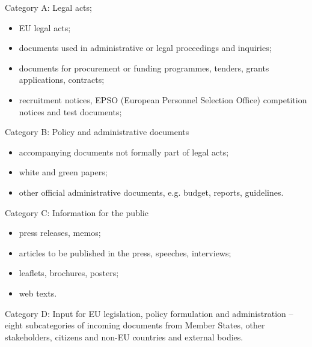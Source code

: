 \documentclass[output=paper]{langsci/langscibook}
\begin{document}
Category A: Legal acts;
\begin{itemize}
\item 
EU legal acts; 
\item 
documents used in administrative or legal proceedings and inquiries; 
\item 
documents for procurement or funding programmes, tenders, grants applications, contracts; 
\item 
recruitment notices, EPSO (European Personnel Selection Office) competition notices and test documents;
\end{itemize}

Category B: Policy and administrative documents

\begin{itemize}
\item 
accompanying documents not formally part of legal acts; 
\item 
white and green papers; 
\item 
other official administrative documents, e.g. budget, reports, guidelines.
\end{itemize}

Category C: Information for the public

\begin{itemize}
\item 
press releases, memos; 
\item 
articles to be published in the press, speeches, interviews;
\item 
leaflets, brochures, posters;
\item 
web texts. 
\end{itemize}

Category D: Input for EU legislation, policy formulation and administration – eight subcategories of incoming documents from Member States, other stakeholders, citizens and non-EU countries and external bodies.
\end{document}
